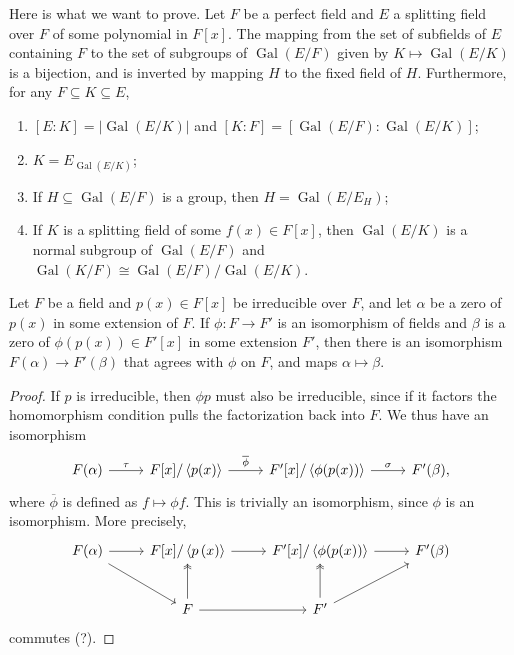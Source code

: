 Here is what we want to prove. Let $F$ be a perfect field and $E$ a splitting field over $F$ of some polynomial in $F[x]$. The mapping from the set of subfields of $E$ containing $F$ to the set of subgroups of $\operatorname{Gal} (E/F)$ given by $K\mapsto \operatorname{Gal} (E/K)$ is a bijection, and is inverted by mapping $H$ to the fixed field of $H$. Furthermore, for any $F\subseteq K\subseteq E$,
\begin{enumerate}
	\item $\left[ E:K \right] =\left| \operatorname{Gal} (E/K) \right| $ and $\left[ K:F \right] =\left[ \operatorname{Gal} (E/F): \operatorname{Gal} (E/K) \right] $;
	\item $K=E_{\operatorname{Gal} (E/K)} $;
	\item If $H\subseteq \operatorname{Gal} (E/F)$ is a group, then $H=\operatorname{Gal} (E/E_H)$;
	\item If $K$ is a splitting field of some $f(x)\in F[x]$, then $\operatorname{Gal} (E/K)$ is a normal subgroup of $\operatorname{Gal} (E/F)$ and $\operatorname{Gal} (K/F)\cong \operatorname{Gal} (E/F) / \operatorname{Gal} (E/K)$.
\end{enumerate}

\begin{lemma}\label{lma:owo}
	Let $F$ be a field and $p(x)\in F[x]$ be irreducible over $F$, and let $\alpha $ be a zero of $p(x)$ in some extension of $F$. If $\phi : F \to F'$ is an isomorphism of fields and $\beta $ is a zero of $\phi (p(x))\in F'[x]$ in some extension $F'$, then there is an isomorphism $F(\alpha )\to F'(\beta )$ that agrees with $\phi $ on $F$, and maps $\alpha \mapsto \beta $.
\end{lemma}
\begin{proof}
	If $p$ is irreducible, then $\phi p$ must also be irreducible, since if it factors the homomorphism condition pulls the factorization back into $F$. We thus have an isomorphism
	\[\begin{tikzcd}[row sep = 2.5em, column sep = 2.5em]
		F(\alpha )\ar[r, "\tau "]&F[x]/\left\langle p(x) \right\rangle \ar[r, " \overline{\phi } "]&F'[x]/\left\langle \phi (p(x)) \right\rangle \ar[r, "\sigma "]&F'(\beta ),
	\end{tikzcd}\]
	where $\overline{\phi } $ is defined as $f\mapsto \phi f$. This is trivially an isomorphism, since $\phi $ is an isomorphism. More precisely,
	\[\begin{tikzcd}[row sep = 2.5em, column sep = 2.5em]
		F(\alpha )\ar[r]\ar[dr]&F[x]/\left\langle p\left( x \right)  \right\rangle \ar[r]&F'[x]/\left\langle \phi (p(x)) \right\rangle \ar[r]&F'(\beta )\\
				       &F\ar[r]\ar[u, two heads]&F'\ar[u, two heads]\ar[ur]
	\end{tikzcd}\]
	commutes (?).
\end{proof}

